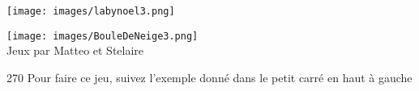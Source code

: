 \newpage
\begin{center}
\vspace*{-1cm}
\end{center}
\vspace*{-1.1cm}
\vspace*{-1.8cm}\texttt{[image: images/labynoel3.png]}

\vspace*{-1.7cm}
\begin{center}
\vspace*{-.8cm}\begin{minipage}{.9\textwidth}
\texttt{[image: images/BouleDeNeige3.png]}\\
Jeux par Matteo et Stelaire
\end{minipage}\hspace*{1mm}\begin{minipage}{.06\textwidth}
\begin{rotate}{270}
\hspace*{-5.6cm}Pour faire ce jeu, suivez l'exemple donné dans le petit carré en haut à gauche
\end{rotate}
\end{minipage}
\end{center}

